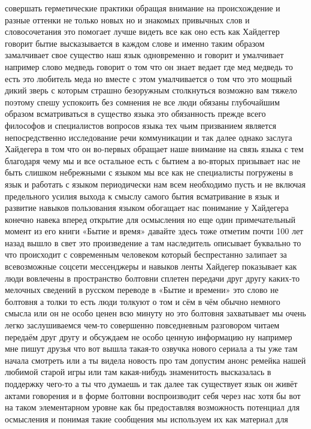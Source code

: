 совершать герметические практики обращая внимание на происхождение и разные
оттенки не только новых но и знакомых привычных слов и словосочетания это
помогает лучше видеть все как оно есть как Хайдеггер говорит бытие высказывается
в каждом слове и именно таким образом замалчивает свое существо наш язык
одновременно и говорит и умалчивает например слово медведь говорит о том что он
знает ведает где мед медведь то есть это любитель меда но вместе с этом
умалчивается о том что это мощный дикий зверь с которым страшно безоружным
столкнуться возможно вам тяжело поэтому спешу успокоить без сомнения не все люди
обязаны глубочайшим образом всматриваться в существо языка это обязанность
прежде всего философов и специалистов вопросов языка тех чьим призванием
является непосредственно исследование речи коммуникации и так далее однако
заслуга Хайдегера в том что он во-первых обращает наше внимание на связь языка с
тем благодаря чему мы и все остальное есть с бытием а во-вторых призывает нас не
быть слишком небрежными с языком мы все как не специалисты погружены в язык и
работать с языком периодически нам всем необходимо пусть и не включая
предельного усилия выхода к смыслу самого бытия всматривание в язык и развитие
навыков пользования языком обогащает нас понимание у Хайдегера конечно навека
вперед открытие для осмысления но еще один примечательный момент из его книги
«Бытие и время» давайте здесь тоже отметим почти 100 лет назад вышло в свет это
произведение а там наследитель описывает буквально то что происходит с
современным человеком который беспрестанно залипает за всевозможные соцсети
мессенджеры и навыков ленты Хайдегер показывает как люди вовлечены в
пространство болтовни сплетен передачи друг другу каких-то мелочных сведений в
русском переводе в «Бытие и времени» это слово не болтовня а толки то есть люди
толкуют о том и сём в чём обычно немного смысла или он не особо ценен всю минуту
но это болтовня захватывает мы очень легко заслушиваемся чем-то совершенно
повседневным разговором читаем передаём друг другу и обсуждаем не особо ценную
информацию ну например мне пишут друзья что вот вышла такая-то озвучка нового
сериала а ты уже там начала смотреть или а ты видела новость про там допустим
анонс ремейка нашей любимой старой игры или там какая-нибудь знаменитость
высказалась в поддержку чего-то а ты что думаешь и так далее так существует язык
он живёт актами говорения и в форме болтовни воспроизводит себя через нас хотя
бы вот на таком элементарном уровне как бы предоставляя возможность потенциал
для осмысления и понимая такие сообщения мы используем их как материал для
